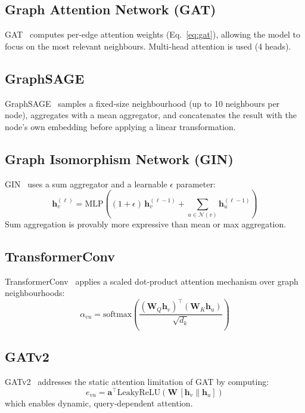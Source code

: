 \documentclass[conference]{IEEEtran}
\begin{document}
\subsection{Graph Attention Network (GAT)}
GAT~\cite{velickovic2018} computes per‑edge attention weights (Eq.~\ref{eq:gat}), allowing the model to focus on the most relevant neighbours. Multi‑head attention is used (4 heads).

\subsection{GraphSAGE}
GraphSAGE~\cite{hamilton2017} samples a fixed‑size neighbourhood (up to 10 neighbours per node), aggregates with a mean aggregator, and concatenates the result with the node's own embedding before applying a linear transformation.

\subsection{Graph Isomorphism Network (GIN)}
GIN~\cite{xu2019} uses a sum aggregator and a learnable $\epsilon$ parameter:
\begin{equation}
\mathbf{h}_v^{(\ell)} = \text{MLP}\!\left((1+\epsilon)\,\mathbf{h}_v^{(\ell-1)} + \sum_{u\in\mathcal{N}(v)}\mathbf{h}_u^{(\ell-1)}\right)
\end{equation}
Sum aggregation is provably more expressive than mean or max aggregation.

\subsection{TransformerConv}
TransformerConv~\cite{shi2021} applies a scaled dot‑product attention mechanism over graph neighbourhoods:
\begin{equation}
\alpha_{vu}=\text{softmax}\!\left(\frac{(\mathbf{W}_Q\mathbf{h}_v)^{\top}(\mathbf{W}_K\mathbf{h}_u)}{\sqrt{d_k}}\right)
\end{equation}

\subsection{GATv2}
GATv2~\cite{brody2022} addresses the static attention limitation of GAT by computing:
\begin{equation}
 e_{vu}=\mathbf{a}^{\top}\text{LeakyReLU}\!\left(\mathbf{W}\,[\mathbf{h}_v \| \mathbf{h}_u]\right)
\end{equation}
which enables dynamic, query‑dependent attention.
\end{document}
